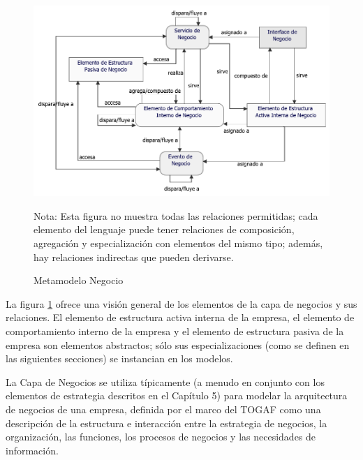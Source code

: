 \begin{figure}[h!]
	\centering
	\begin{minipage}{1\textwidth} %
	\includegraphics[width=0.9\linewidth]{imgs/meta/Negocio}
	\caption{Metamodelo Negocio}
	\label{fig:business}
	{\footnotesize Nota: Esta figura no muestra todas las relaciones permitidas; cada elemento del lenguaje puede tener relaciones de composición, agregación y especialización con elementos del mismo tipo; además, hay relaciones indirectas que pueden derivarse.\par}
	\end{minipage}
\end{figure}

La figura \ref{fig:business} ofrece una visión general de los elementos de la capa de negocios y sus relaciones. El elemento de estructura activa interna de la empresa, el elemento de comportamiento interno de la empresa y el elemento de estructura pasiva de la empresa son elementos abstractos; sólo sus especializaciones (como se definen en las siguientes secciones) se instancian en los modelos.

La Capa de Negocios se utiliza típicamente (a menudo en conjunto con los elementos de estrategia descritos en el Capítulo 5) para modelar la arquitectura de negocios de una empresa, definida por el marco del TOGAF como una descripción de la estructura e interacción entre la estrategia de negocios, la organización, las funciones, los procesos de negocios y las necesidades de información.

\newpage


\clearpage


\clearpage


\clearpage



\clearpage



\clearpage

